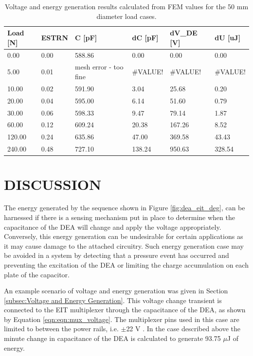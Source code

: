 \begin{table}[H]
	\centering
	\label{tab:volt-energy-gen-50m}
	\caption{Voltage and energy generation results calculated from FEM values for the 50 mm diameter load cases.}
	\vspace{0.3cm}
	\begin{tabular}{llllll}
		\textbf{Load {[}N{]}} & \textbf{ESTRN} & \textbf{C {[}pF{]}} & \textbf{dC {[}pF{]}} & \textbf{dV\_DE {[}V{]}} & \textbf{dU {[}uJ{]}} \\ \hline
		0.00 & 0.00 & 588.86 & 0.00 & 0.00 & 0.00 \\
		5.00 & 0.01 & mesh   error - too fine & \#VALUE! & \#VALUE! & \#VALUE! \\
		10.00 & 0.02 & 591.90 & 3.04 & 25.68 & 0.20 \\
		20.00 & 0.04 & 595.00 & 6.14 & 51.60 & 0.79 \\
		30.00 & 0.06 & 598.33 & 9.47 & 79.14 & 1.87 \\
		60.00 & 0.12 & 609.24 & 20.38 & 167.26 & 8.52 \\
		120.00 & 0.24 & 635.86 & 47.00 & 369.58 & 43.43 \\
		240.00 & 0.48 & 727.10 & 138.24 & 950.63 & 328.54
	\end{tabular}
\end{table}


\section{DISCUSSION}
\label{sec:concs_disc}
The energy generated by the sequence shown in Figure \ref{fig:dea_eit_deg}, can be harnessed if there is a sensing mechanism put in place to determine when the capacitance of the DEA will change and apply the voltage appropriately. Conversely, this energy generation can be undesirable for certain applications as it may cause damage to the attached circuitry.
Such energy generation case may be avoided in a system by detecting that a pressure event has occurred and preventing the excitation of the DEA or limiting the charge accumulation on each plate of the capacitor.

An example scenario of voltage and energy generation was given in Section \ref{subsec:Voltage and Energy Generation}. This voltage change transient is connected to the EIT multiplexer through the capacitance of the DEA, as shown by Equation \ref{eqn:eqn:mux_voltage}. The multiplexer pins used in this case are limited to between the power rails, i.e. $\pm$22 V \cite{VishayPG2018}. In the case described above the minute change in capacitance of the DEA is calculated to generate 93.75 $\mu$J of energy.

